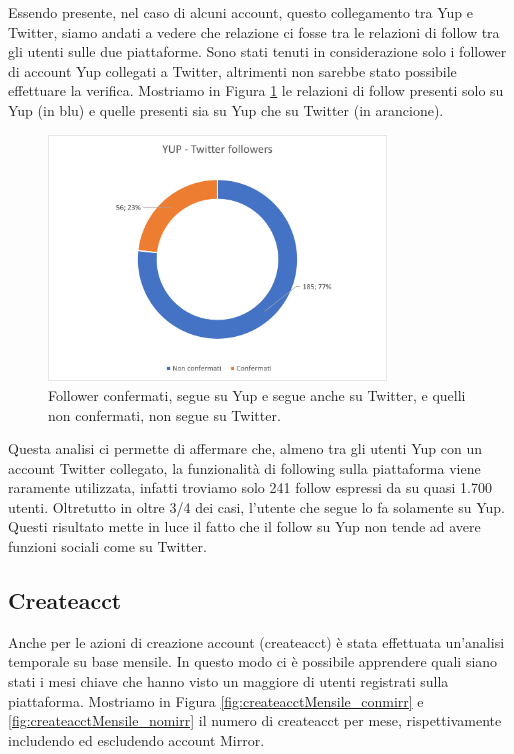 Essendo presente, nel caso di alcuni account, questo collegamento tra Yup e Twitter, siamo andati a vedere che relazione ci fosse tra le relazioni di follow tra gli utenti sulle due piattaforme. Sono stati tenuti in considerazione solo i follower di account Yup collegati a Twitter, altrimenti non sarebbe stato possibile effettuare la verifica. Mostriamo in Figura \ref{fig:followersComparison} le relazioni di follow presenti solo su Yup (in blu) e quelle presenti sia su Yup che su Twitter (in arancione).

\begin{figure}[t]
    \centering
    \includegraphics[width=0.8\textwidth]{graphs/followers.png}
    \caption{Follower confermati, segue su Yup e segue anche su Twitter, e quelli non confermati, non segue su Twitter.}
    \label{fig:followersComparison}
\end{figure}

Questa analisi ci permette di affermare che, almeno tra gli utenti Yup con un account Twitter collegato, la funzionalità di following sulla piattaforma viene raramente utilizzata, infatti troviamo solo 241 follow espressi da su quasi 1.700 utenti. Oltretutto in oltre 3/4 dei casi, l'utente che segue lo fa solamente su Yup.
Questi risultato mette in luce il fatto che il follow su Yup non tende ad avere funzioni sociali come su Twitter.

\subsection{Createacct}
Anche per le azioni di creazione account (createacct) è stata effettuata un'analisi temporale su base mensile. In questo modo ci è possibile apprendere quali siano stati i mesi chiave che hanno visto un maggiore di utenti registrati sulla piattaforma. Mostriamo in Figura \ref{fig:createacctMensile_conmirr} e \ref{fig:createacctMensile_nomirr} il numero di createacct per mese, rispettivamente includendo ed escludendo account Mirror.

